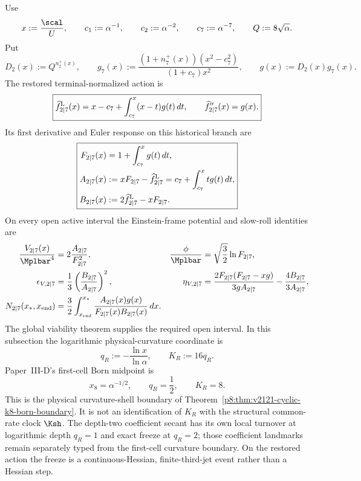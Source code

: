 \documentclass[12pt,a4paper]{article}
\begin{document}
Use
\[
 x:=\frac{\scal}{U},\qquad
 c_1:=\alpha^{-1},\qquad c_2:=\alpha^{-2},\qquad c_7:=\alpha^{-7},
 \qquad Q:=8\sqrt\alpha .
\]
Put
\[
 D_2(x):=Q^{n_2^+(x)},\qquad
 g_7(x):=\frac{(1+n_7^+(x))(x^2-c_7^2)}{(1+c_7)x^2},\qquad
 g(x):=D_2(x)g_7(x).
\]
The restored terminal-normalized action is
\begin{equation}
\label{p8:eq:laur17-inflation-fhat}
 \boxed{
 \widehat f_{2\mid7}^{\rm L}(x)
 =x-c_7+\int_{c_7}^{x}(x-t)g(t)\,dt,\qquad
 \widehat f_{2\mid7}''(x)=g(x).}
\end{equation}
Its first derivative and Euler response on this historical branch are
\begin{equation}
\label{p8:eq:laur17-AB}
 \boxed{
 \begin{aligned}
 F_{2\mid7}(x)&=1+\int_{c_7}^{x}g(t)\,dt,\\
 A_{2\mid7}(x)&:=xF_{2\mid7}-\widehat f_{2\mid7}^{\rm L}
 =c_7+\int_{c_7}^{x}t g(t)\,dt,\\
 B_{2\mid7}(x)&:=2\widehat f_{2\mid7}^{\rm L}-xF_{2\mid7}.
 \end{aligned}}
\end{equation}
On every open active interval the Einstein-frame potential and slow-roll
identities are
\begin{align}
\label{p8:eq:laur17-potential-slowroll}
 \frac{V_{2\mid7}(x)}{\Mplbar^4}
 &=2\frac{A_{2\mid7}}{F_{2\mid7}^2},
 &\frac{\phi}{\Mplbar}&=\sqrt{\frac32}\ln F_{2\mid7},\\
 \epsilon_{V,2\mid7}
 &=\frac13\left(\frac{B_{2\mid7}}{A_{2\mid7}}\right)^2,
 &\eta_{V,2\mid7}
 &=\frac{2F_{2\mid7}(F_{2\mid7}-xg)}{3gA_{2\mid7}}
   -\frac{4B_{2\mid7}}{3A_{2\mid7}},\\
 N_{2\mid7}(x_*,x_{\rm end})
 &=\frac32\int_{x_{\rm end}}^{x_*}
 \frac{A_{2\mid7}(x)g(x)}{F_{2\mid7}(x)B_{2\mid7}(x)}\,dx.
\end{align}
The global viability theorem supplies the required open interval.  In this
subsection the logarithmic physical-curvature coordinate is
\[
 q_R:=-\frac{\ln x}{\ln\alpha},\qquad K_R:=16q_R.
\]
Paper~III-D's first-cell Born midpoint is
\[
 x_8=\alpha^{-1/2},\qquad q_R=\frac12,\qquad \boxed{K_R=8}.
\]
This is the physical curvature-shell boundary of
Theorem~\ref{p8:thm:v2121-cyclic-k8-born-boundary}.  It is not an identification
of \(K_R\) with the structural common-rate clock \(\Ksh\).  The depth-two
coefficient secant has its own local turnover at logarithmic depth \(q_R=1\)
and exact freeze at \(q_R=2\); those coefficient landmarks remain separately
typed from the first-cell curvature boundary.  On the restored action the
freeze is a continuous-Hessian, finite-third-jet event rather than a Hessian
step.
\end{document}

